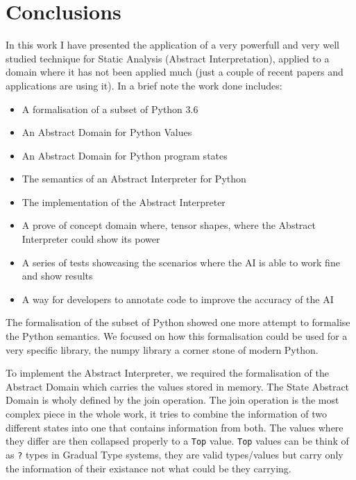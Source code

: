 \chapter{Conclusions}\label{conclusions}

{}

In this work I have presented the application of a very powerfull and
very well studied technique for Static Analysis (Abstract
Interpretation), applied to a domain where it has not been applied much
(just a couple of recent papers and applications are using it). In a
brief note the work done includes:

\begin{itemize}
\tightlist
\item
  A formalisation of a subset of Python 3.6
\item
  An Abstract Domain for Python Values
\item
  An Abstract Domain for Python program states
\item
  The semantics of an Abstract Interpreter for Python
\item
  The implementation of the Abstract Interpreter
\item
  A prove of concept domain where, tensor shapes, where the Abstract
  Interpreter could show its power
\item
  A series of tests showcasing the scenarios where the AI is able to
  work fine and show results
\item
  A way for developers to annotate code to improve the accuracy of the
  AI
\end{itemize}

The formalisation of the subset of Python showed one more attempt to
formalise the Python semantics. We focused on how this formalisation
could be used for a very specific library, the numpy library a corner
stone of modern Python.

To implement the Abstract Interpreter, we required the formalisation of
the Abstract Domain which carries the values stored in memory. The State
Abstract Domain is wholy defined by the join operation. The join
operation is the most complex piece in the whole work, it tries to
combine the information of two different states into one that contains
information from both. The values where they differ are then collapsed
properly to a \texttt{Top} value. \texttt{Top} values can be think of as
\texttt{?} types in Gradual Type systems, they are valid types/values
but carry only the information of their existance not what could be they
carrying.


